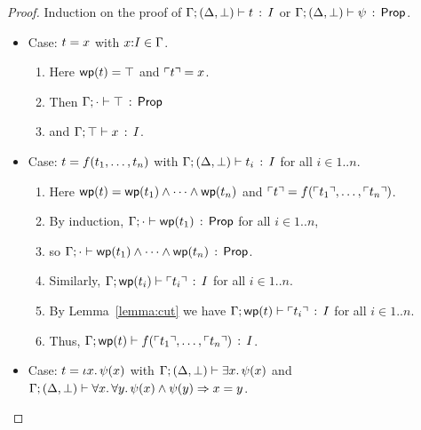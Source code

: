 \documentclass[11pt]{article}
\begin{document}
\begin{proof}
  \raggedright Induction on the proof of
  $\Gamma;(\Delta,\bot) \vdash t\, :\, I$ or $\Gamma;(\Delta,\bot) \vdash \psi\, :\, \mathsf{Prop}$.
  \begin{itemize}
  \item Case: $t = x$ with $x{:}I\in\Gamma$.  
    \begin{enumerate}
      \item
        Here $\mathop{\mathsf{wp}}(t) = \top$ and $\ulcorner t \urcorner = x$.
      \item
        Then $\Gamma;\cdot \vdash \top\, :\, \mathsf{Prop}$ 
      \item
        and $\Gamma;\top \vdash x\, :\, I$.
      \end{enumerate}
  \item Case: $t = f({t}_1,\ldots,{t}_{n})$ with
    $\Gamma;(\Delta,\bot) \vdash t_i\, :\, I$ for all $i\in1..n$.
    \begin{enumerate}
    \item
      Here $\mathop{\mathsf{wp}}(t) =
      \mathop{\mathsf{wp}}(t_1) \wedge \cdots \wedge \mathop{\mathsf{wp}}(t_n)$
      and $\ulcorner t \urcorner = f(\ulcorner t_1 \urcorner,\ldots,\ulcorner t_n \urcorner)$.
    \item 
    	By induction,
      $\Gamma;\cdot \vdash \mathop{\mathsf{wp}}(t_1)\, :\, \mathsf{Prop}$ for
      all $i\in1..n$, 
    \item 
    	so
    $\Gamma;\cdot \vdash \mathop{\mathsf{wp}}(t_1) \wedge \cdots \wedge \mathop{\mathsf{wp}}(t_n)\, :\, \mathsf{Prop}$.
    \item 
    Similarly, $\Gamma;\mathop{\mathsf{wp}}(t_i) \vdash \ulcorner t_i \urcorner\, :\, I$ for
      all $i\in1..n$.  
    \item
      By Lemma~\ref{lemma:cut} we have
      $\Gamma;\mathop{\mathsf{wp}}(t) \vdash \ulcorner t_i \urcorner\, :\, I$ for
      all $i\in1..n$.  
    \item Thus,
      $\Gamma;\mathop{\mathsf{wp}}(t) \vdash f(\ulcorner t_1 \urcorner,\ldots,\ulcorner t_n \urcorner)\, :\, I$.  
    \end{enumerate}
    
  \goodbreak
    
  \item Case: $t = \iota x.\, \psi(x)$ with
  $\Gamma;(\Delta,\bot) \vdash \exists x.\, \psi(x)$ and 
  $\Gamma;(\Delta,\bot) \vdash \forall x.\, \forall y.\, \psi(x) \wedge \psi(y) \Rightarrow x=y$.


\end{itemize}
\end{proof}
\end{document}
